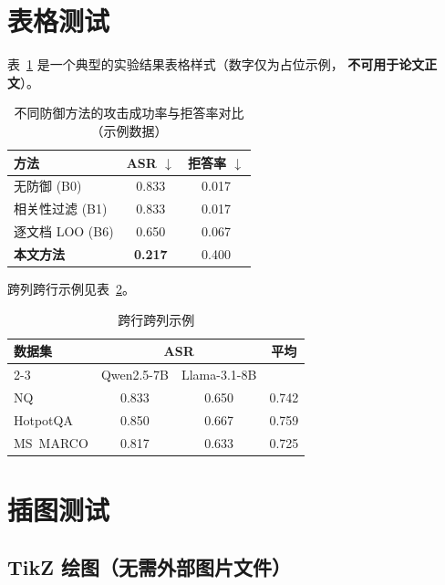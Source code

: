 \documentclass[UTF8, a4paper, 11pt, fontset=fandol]{ctexart}
\begin{document}
\section{表格测试}

表~\ref{tab:result} 是一个典型的实验结果表格样式（数字仅为占位示例，
\textbf{不可用于论文正文}）。

\begin{table}[htbp]
  \centering
  \caption{不同防御方法的攻击成功率与拒答率对比（示例数据）}
  \label{tab:result}
  \begin{tabular}{@{}lcc@{}}
    \toprule
    方法 & ASR $\downarrow$ & 拒答率 $\downarrow$ \\
    \midrule
    无防御 (B0)        & 0.833 & 0.017 \\
    相关性过滤 (B1)    & 0.833 & 0.017 \\
    逐文档 LOO (B6)    & 0.650 & 0.067 \\
    \textbf{本文方法}  & \textbf{0.217} & 0.400 \\
    \bottomrule
  \end{tabular}
\end{table}

跨列跨行示例见表~\ref{tab:merge}。

\begin{table}[htbp]
  \centering
  \caption{跨行跨列示例}
  \label{tab:merge}
  \begin{tabular}{@{}lccc@{}}
    \toprule
    \multirow{2}{*}{数据集} & \multicolumn{2}{c}{ASR} & \multirow{2}{*}{平均} \\
    \cmidrule(lr){2-3}
                       & Qwen2.5-7B & Llama-3.1-8B & \\
    \midrule
    NQ       & 0.833 & 0.650 & 0.742 \\
    HotpotQA & 0.850 & 0.667 & 0.759 \\
    MS~MARCO & 0.817 & 0.633 & 0.725 \\
    \bottomrule
  \end{tabular}
\end{table}

\section{插图测试}

\subsection{TikZ 绘图（无需外部图片文件）}
\end{document}
